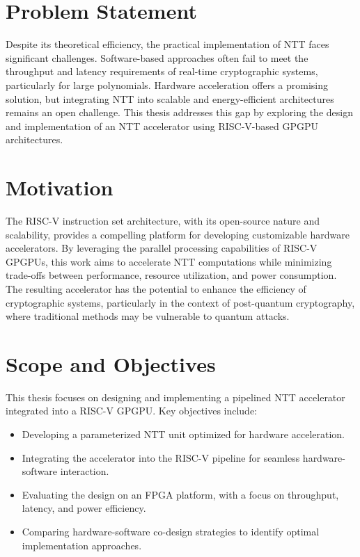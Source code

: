 \documentclass[12pt]{report}
\begin{document}
\section{Problem Statement}

Despite its theoretical efficiency, the practical implementation of NTT faces significant challenges. Software-based approaches often fail to meet the throughput and latency requirements of real-time cryptographic systems, particularly for large polynomials. Hardware acceleration offers a promising solution, but integrating NTT into scalable and energy-efficient architectures remains an open challenge. This thesis addresses this gap by exploring the design and implementation of an NTT accelerator using RISC-V-based GPGPU architectures.

\section{Motivation}

The RISC-V instruction set architecture, with its open-source nature and scalability, provides a compelling platform for developing customizable hardware accelerators. By leveraging the parallel processing capabilities of RISC-V GPGPUs, this work aims to accelerate NTT computations while minimizing trade-offs between performance, resource utilization, and power consumption. The resulting accelerator has the potential to enhance the efficiency of cryptographic systems, particularly in the context of post-quantum cryptography, where traditional methods may be vulnerable to quantum attacks.

\section{Scope and Objectives}

This thesis focuses on designing and implementing a pipelined NTT accelerator integrated into a RISC-V GPGPU. Key objectives include:
\begin{itemize}
    \item Developing a parameterized NTT unit optimized for hardware acceleration.
    \item Integrating the accelerator into the RISC-V pipeline for seamless hardware-software interaction.
    \item Evaluating the design on an FPGA platform, with a focus on throughput, latency, and power efficiency.
    \item Comparing hardware-software co-design strategies to identify optimal implementation approaches.
\end{itemize}
\end{document}
